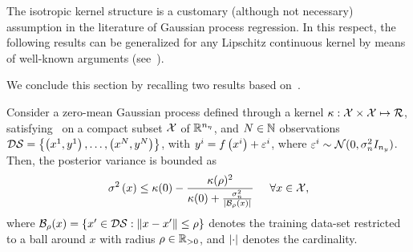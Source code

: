 \begin{remark}
   The isotropic kernel structure is a customary (although not necessary) assumption in the literature of Gaussian process regression.
   In this respect, the following results can be generalized for any Lipschitz continuous kernel by means of well-known arguments (see~\cite{lederer2021uniform}).
\end{remark}
We conclude this section by recalling two results based on~\cite{lederer2021uniform}.
\begin{lemma}%
   \label{LEMMA:PREP-VARIANCE-BOUND}
   Consider a zero-mean Gaussian process defined through a kernel $\kappa: \mathcal{X} \times \mathcal{X} \mapsto \mathcal{R}$,
   satisfying~
   on a compact subset $\mathcal{X}$ of $\mathbb{R}^{n_{\eta}}$, and $N \in \mathbb{N}$ observations
   $\mathcal{DS} = \left\{ \left( x^1, y^1 \right), \dots, \left( x^N, y^N \right) \right\}$, with
   $y^i = f \left( x^i \right) + \varepsilon^i$, where $\varepsilon^i \sim \mathcal{N}(0, \sigma_n^2 I_{n_{y}})$.
   Then, the posterior variance is bounded as
   \begin{equation*}
      \sigma^2 \left( x \right) \le \kappa(0) - \frac{\kappa(\rho)^2}{\kappa(0) + \frac{\sigma_n^2}{\left| \mathcal{B}_{\rho}(x) \right|}} \hspace*{0.5cm} \forall x \in \mathcal{X},
   \end{equation*}
   where $\mathcal{B}_{\rho}(x) = \left\{ x' \in \mathcal{DS} : \left \lVert {x - x'} \right \rVert \le \rho \right\}$
   denotes the training data-set restricted to a ball around $x$ with radius $\rho \in \mathbb{R}_{>0}$, and $\left| \cdot \right|$ denotes the cardinality.
\end{lemma}
